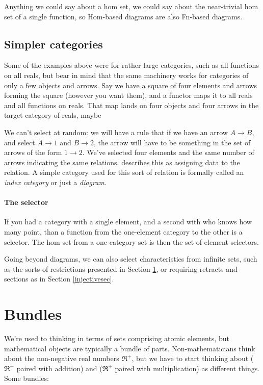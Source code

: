 \documentclass[11pt]{article}
\begin{document}
Anything we could say about a hom set, we could say about the near-trivial hom
set of a single function, so Hom-based diagrams are also Fn-based diagrams.

\subsection{Simpler categories}
Some of the examples above were for rather large categories, such as all functions on all
reals, but bear in mind that the same machinery works for categories of only a few objects
and arrows. Say we have a square of four elements and arrows forming the square (however
you want them), and a functor maps it to all reals and all functions on reals. That map
lands on four objects and four arrows in the target category of reals, maybe


We can't select at random: we will have a rule that if we have an arrow $A\to B$, and
select $A\to 1$ and $B\to 2$, the arrow will have to be something in the set of arrows
of the form $1\to 2$. We've
selected four elements and the same number of arrows indicating the same relations.
\citet{leinster:basic} describes this as assigning data to the relation. A simple category
used for this sort of relation is formally called an {\em index category} or just a {\em diagram}. \label{diagramref}

\paragraph{The selector}
If you had a category with a single element, and a second with who knows how many point, than a
function from the one-element category to the other is a selector.
The hom-set from a one-category set is then the set of element selectors.

Going beyond diagrams, we can also select characteristics from infinite sets,
such as the sorts of restrictions presented in Section
\ref{bundlesec}, or requiring retracts and sections as in Section \ref{injectivesec}.

\section{Bundles}\label{bundlesec}
We're used to thinking in terms of sets comprising atomic elements, but mathematical
objects are typically a bundle of parts. Non-mathematicians think about the non-negative real numbers
$\Re^+$, but we have to start thinking about ($\Re^+$ paired with addition) and ($\Re^+$
paired with multiplication) as different things. Some bundles:
\end{document}

